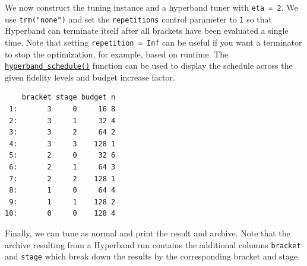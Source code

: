 We now construct the tuning instance and a hyperband tuner with
\texttt{eta\ =\ 2}. We use \texttt{trm("none")} and set the
\texttt{repetitions} control parameter to \texttt{1} so that Hyperband
can terminate itself after all brackets have been evaluated a single
time. Note that setting \texttt{repetition\ =\ Inf} can be useful if you
want a terminator to stop the optimization, for example, based on
runtime. The
\href{https://mlr3hyperband.mlr-org.com/reference/hyperband_schedule.html}{\texttt{hyperband\_schedule()}}
function can be used to display the schedule across the given fidelity
levels and budget increase factor.

\begin{Shaded}
\begin{Highlighting}[]
\OtherTok{=} \NormalTok{(}
   \NormalTok{(}\NormalTok{),}
   \NormalTok{(}\NormalTok{),}
   \NormalTok{(}\NormalTok{),}
   \NormalTok{(}\NormalTok{)}
\NormalTok{)}

\OtherTok{=} \NormalTok{(}\NormalTok{, } \NormalTok{, } \NormalTok{)}

\NormalTok{(} \NormalTok{, } \NormalTok{, } \NormalTok{)}
\end{Highlighting}
\end{Shaded}

\begin{verbatim}
    bracket stage budget n
 1:       3     0     16 8
 2:       3     1     32 4
 3:       3     2     64 2
 4:       3     3    128 1
 5:       2     0     32 6
 6:       2     1     64 3
 7:       2     2    128 1
 8:       1     0     64 4
 9:       1     1    128 2
10:       0     0    128 4
\end{verbatim}

Finally, we can tune as normal and print the result and archive. Note
that the archive resulting from a Hyperband run contains the additional
columns \texttt{bracket} and \texttt{stage} which break down the results
by the corresponding bracket and stage.


